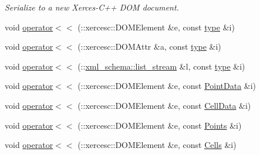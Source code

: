 \begin{DoxyCompactItemize}
\begin{DoxyCompactList}\small\item\em Serialize to a new Xerces-\/\-C++ D\-O\-M document. \end{DoxyCompactList}\item 
void \hyperlink{vtk-unstructured_8cpp_a39982a892c5c712b9ceaf5451fc6f4ad}{operator$<$$<$} (\-::xercesc\-::\-D\-O\-M\-Element \&e, const \hyperlink{classtype}{type} \&i)
\item 
void \hyperlink{vtk-unstructured_8cpp_a4fb8d54838ba8178be88528f342c8b27}{operator$<$$<$} (\-::xercesc\-::\-D\-O\-M\-Attr \&a, const \hyperlink{classtype}{type} \&i)
\item 
void \hyperlink{vtk-unstructured_8cpp_abc84c964f7011b68cb249e0dd527a052}{operator$<$$<$} (\-::\hyperlink{namespacexml__schema_ab6c818ac91e70a25620375e0d000be83}{xml\-\_\-schema\-::list\-\_\-stream} \&l, const \hyperlink{classtype}{type} \&i)
\item 
void \hyperlink{vtk-unstructured_8cpp_a03c700ca3f77780311236cfbb43b28a6}{operator$<$$<$} (\-::xercesc\-::\-D\-O\-M\-Element \&e, const \hyperlink{classPointData}{Point\-Data} \&i)
\item 
void \hyperlink{vtk-unstructured_8cpp_a9000f9f93a0e3f8c8a2d0de1ddae77c8}{operator$<$$<$} (\-::xercesc\-::\-D\-O\-M\-Element \&e, const \hyperlink{classCellData}{Cell\-Data} \&i)
\item 
void \hyperlink{vtk-unstructured_8cpp_a155fa88f0f3a3fb5f55f06539205ef01}{operator$<$$<$} (\-::xercesc\-::\-D\-O\-M\-Element \&e, const \hyperlink{classPoints}{Points} \&i)
\item 
void \hyperlink{vtk-unstructured_8cpp_a043b0bbda942e0878ce7a8f63ddefe79}{operator$<$$<$} (\-::xercesc\-::\-D\-O\-M\-Element \&e, const \hyperlink{classCells}{Cells} \&i)
\end{DoxyCompactItemize}


